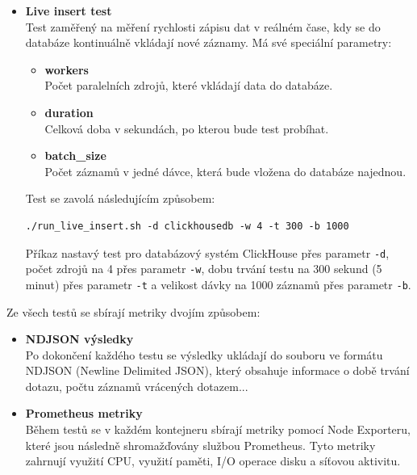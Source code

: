 \begin{itemize}
     \item \textbf{Live insert test} \\
    Test zaměřený na měření rychlosti zápisu dat v reálném čase, kdy se do databáze kontinuálně vkládají nové záznamy.
    Má své speciální parametry:
    \begin{itemize}
        \item \textbf{workers} \\
        Počet paralelních zdrojů, které vkládají data do databáze.
        \item \textbf{duration} \\
        Celková doba v sekundách, po kterou bude test probíhat.
        \item \textbf{batch\_size} \\
        Počet záznamů v jedné dávce, která bude vložena do databáze najednou.
    \end{itemize}
    Test se zavolá následujícím způsobem:
    \begin{lstlisting}[caption={Příklad spuštění live insert testu}, label={lst:liveinsert}, captionpos=b]
    ./run_live_insert.sh -d clickhousedb -w 4 -t 300 -b 1000
    \end{lstlisting}
    Příkaz nastavý test pro databázový systém ClickHouse přes parametr \texttt{-d}, počet zdrojů na 4 přes parametr \texttt{-w}, dobu trvání testu na 300 sekund (5 minut) přes parametr \texttt{-t} a velikost dávky na 1000 záznamů přes parametr \texttt{-b}.
\end{itemize}

Ze všech testů se sbírají metriky dvojím způsobem:
\begin{itemize}
    \item \textbf{NDJSON výsledky} \\
    Po dokončení každého testu se výsledky ukládají do souboru ve formátu NDJSON (Newline Delimited JSON), který obsahuje informace o době trvání dotazu, počtu záznamů vrácených dotazem...
    \item \textbf{Prometheus metriky} \\
    Během testů se v každém kontejneru sbírají metriky pomocí Node Exporteru, které jsou následně shromažďovány službou Prometheus. 
    Tyto metriky zahrnují využití CPU, využití paměti, I/O operace disku a síťovou aktivitu.
\end{itemize}


